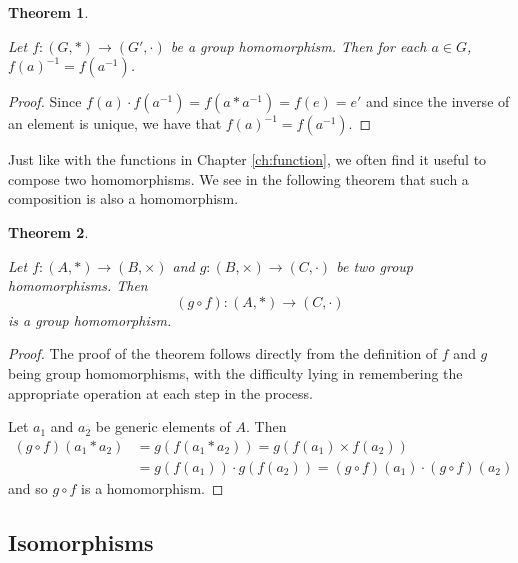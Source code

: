 \documentclass[
]{book}
\newtheorem{theorem}{Theorem}[chapter]
\theoremstyle{definition}
\theoremstyle{definition}
\theoremstyle{definition}
\theoremstyle{definition}
\theoremstyle{remark}
\begin{document}
\begin{theorem}
\protect\hypertarget{thm:homomorphism-inverse}{}\label{thm:homomorphism-inverse}

Let \(f:(G,*)\rightarrow (G',\cdot)\) be a group homomorphism. Then for each \(a\in G\), \(f(a)^{-1} = f\left(a^{-1}\right)\).

\end{theorem}

\begin{proof}

Since \(f(a) \cdot f\left(a^{-1}\right) = f\left(a*a^{-1}\right) = f(e) = e'\) and since the inverse of an element is unique, we have that \(f(a)^{-1} = f\left(a^{-1}\right)\).

\end{proof}

Just like with the functions in Chapter \ref{ch:function}, we often find it useful to compose two homomorphisms. We see in the following theorem that such a composition is also a homomorphism.

\begin{theorem}
\protect\hypertarget{thm:homomorphism-composition}{}\label{thm:homomorphism-composition}

Let \(f: (A,*) \rightarrow (B,\times)\) and \(g:(B,\times) \rightarrow (C,\cdot)\) be two group homomorphisms. Then \[(g\circ f): (A,*) \rightarrow (C,\cdot)\] is a group homomorphism.

\end{theorem}

\begin{proof}

The proof of the theorem follows directly from the definition of \(f\) and \(g\) being group homomorphisms, with the difficulty lying in remembering the appropriate operation at each step in the process.

Let \(a_1\) and \(a_2\) be generic elements of \(A\). Then
\begin{align*}
(g\circ f)(a_1 * a_2) &= g \left( f(a_1*a_2)\right) = g\left( f(a_1)\times f(a_2)\right) \\
&= g(f(a_1)) \cdot g(f(a_2)) = (g\circ f)(a_1) \cdot (g\circ f)(a_2)
\end{align*}
and so \(g\circ f\) is a homomorphism.

\end{proof}

\hypertarget{isomorphisms}{%
\subsection{Isomorphisms}\label{isomorphisms}}
\end{document}
